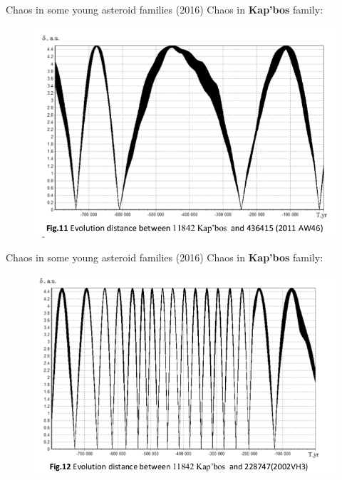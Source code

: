 \documentclass{beamer}
\begin{document}
\begin{frame}{Chaos in some young asteroid families (2016)}
        Chaos in \textbf{Kap'bos} family:
\begin{figure}[h]
\begin{minipage}[h]{0.8\linewidth}
\includegraphics[width=1\linewidth]{./16_4.png}
\end{minipage}
\end{figure}
\end{frame}

\begin{frame}{Chaos in some young asteroid families (2016)}
        Chaos in \textbf{Kap'bos} family:
\begin{figure}[h]
\begin{minipage}[h]{0.8\linewidth}
\includegraphics[width=1\linewidth]{./16_5.png}
\end{minipage}
\end{figure}
\end{frame}
\end{document}
